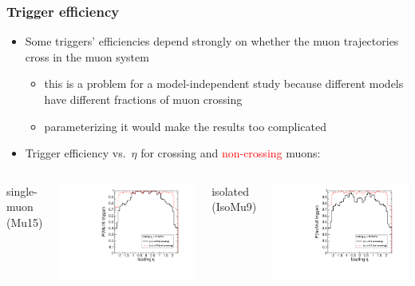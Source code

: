 \documentclass[compress]{beamer}
\begin{document}
\begin{frame}
\frametitle{Trigger efficiency}

\begin{itemize}
\item Some triggers' efficiencies depend strongly on whether the muon
  trajectories cross in the muon system
\begin{itemize}
\item this is a problem for a model-independent study because
  different models have different fractions of muon crossing
\item parameterizing it would make the results too complicated
\end{itemize}

\item Trigger efficiency vs.\ $\eta$ for crossing and \textcolor{red}{non-crossing} muons:
\end{itemize}

\begin{columns}
\centering single-muon (Mu15)

\includegraphics[width=\linewidth]{eta_mass5cut_triggerMu15_nosuppressedzero.pdf}

\centering isolated (IsoMu9)

\includegraphics[width=\linewidth]{eta_mass5cut_triggerIsoMu9.pdf}


\end{columns}
\end{frame}
\end{document}
